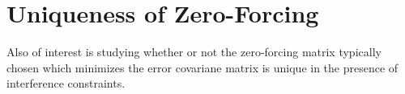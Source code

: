 \documentclass[12pt]{article}
\begin{document}
\section{Uniqueness of Zero-Forcing}
Also of interest is studying whether or not the zero-forcing matrix typically chosen which minimizes the error covariane matrix is unique in the presence of interference constraints. 

\newpage

\end{document}
